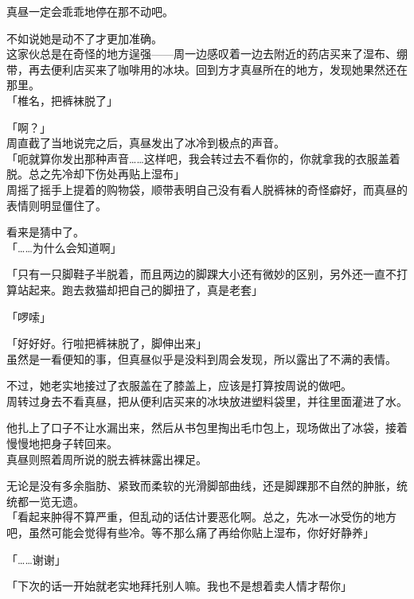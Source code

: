 真昼一定会乖乖地停在那不动吧。

不如说她是动不了才更加准确。\\

这家伙总是在奇怪的地方逞强——周一边感叹着一边去附近的药店买来了湿布、绷带，再去便利店买来了咖啡用的冰块。回到方才真昼所在的地方，发现她果然还在那里。\\

「椎名，把裤袜脱了」

「啊？」\\

周直截了当地说完之后，真昼发出了冰冷到极点的声音。\\

「呃就算你发出那种声音……这样吧，我会转过去不看你的，你就拿我的衣服盖着脱。总之先冷却下伤处再贴上湿布」\\

周摇了摇手上提着的购物袋，顺带表明自己没有看人脱裤袜的奇怪癖好，而真昼的表情则明显僵住了。

看来是猜中了。\\

「……为什么会知道啊」

「只有一只脚鞋子半脱着，而且两边的脚踝大小还有微妙的区别，另外还一直不打算站起来。跑去救猫却把自己的脚扭了，真是老套」

「啰嗦」

「好好好。行啦把裤袜脱了，脚伸出来」\\

虽然是一看便知的事，但真昼似乎是没料到周会发现，所以露出了不满的表情。

不过，她老实地接过了衣服盖在了膝盖上，应该是打算按周说的做吧。\\

周转过身去不看真昼，把从便利店买来的冰块放进塑料袋里，并往里面灌进了水。

他扎上了口子不让水漏出来，然后从书包里掏出毛巾包上，现场做出了冰袋，接着慢慢地把身子转回来。\\

真昼则照着周所说的脱去裤袜露出裸足。

无论是没有多余脂肪、紧致而柔软的光滑脚部曲线，还是脚踝那不自然的肿胀，统统都一览无遗。\\

「看起来肿得不算严重，但乱动的话估计要恶化啊。总之，先冰一冰受伤的地方吧，虽然可能会觉得有些冷。等不那么痛了再给你贴上湿布，你好好静养」

「……谢谢」

「下次的话一开始就老实地拜托别人嘛。我也不是想着卖人情才帮你」\\

